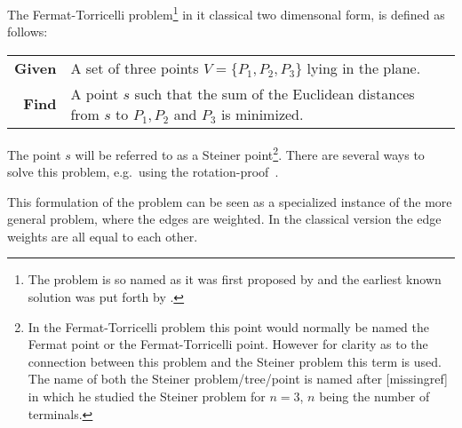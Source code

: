 The Fermat-Torricelli problem\footnote{The problem is so named as it was first
  proposed by \textcite{fermat1891} and the earliest known solution was put
  forth by \textcite{torricelli1919}.} in it classical two dimensonal form, is
defined as follows:
%
\begin{center}
\begin{tabular}{rp{9cm}}
  \toprule
  \textbf{Given} & A set of three points $V = \{P_1, P_2, P_3\}$ lying in the plane. \\
  \textbf{Find}  & A point $s$ such that the sum of the Euclidean distances from
                   $s$ to $P_1, P_2$ and $P_3$ is minimized. \\
  \bottomrule
\end{tabular}
\end{center}
%
The point $s$ will be referred to as a Steiner point\footnote{In the
  Fermat-Torricelli problem this point would normally be named the Fermat point
  or the Fermat-Torricelli point. However for clarity as to the connection
  between this problem and the Steiner problem this term is used. The name of
  both the Steiner problem/tree/point is named after [missingref] in which he
  studied the Steiner problem for $n = 3$, $n$ being the number of
  terminals.}. There are several ways to solve this problem, e.g.\ using the
rotation-proof~\cite[p.~3--5]{brazil2015}.

This formulation of the problem can be seen as a specialized instance of the
more general problem, where the edges are weighted. In the classical version the
edge weights are all equal to each other.

